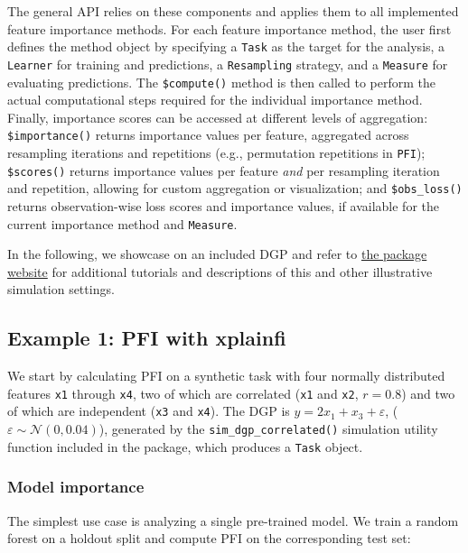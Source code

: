 The general  API relies on these components and applies them to all implemented feature importance methods.
For each feature importance method, the user first defines the method object by specifying a \texttt{Task} as the target for the analysis, a \texttt{Learner} for training and predictions, a \texttt{Resampling} strategy, and a \texttt{Measure} for evaluating predictions.
The \texttt{\$compute()} method is then called to perform the actual computational steps required for the individual importance method.
Finally, importance scores can be accessed at different levels of aggregation:
\texttt{\$importance()} returns importance values per feature, aggregated across resampling iterations and repetitions (e.g., permutation repetitions in \texttt{PFI});
\texttt{\$scores()} returns importance values per feature \emph{and} per resampling iteration and repetition, allowing for custom aggregation or visualization;
and \texttt{\$obs\_loss()} returns observation-wise loss scores and importance values, if available for the current importance method and \texttt{Measure}.

In the following, we showcase  on an included DGP and refer to \href{https://mlr-org.github.io/xplainfi/}{the package website} for additional tutorials and descriptions of this and other illustrative simulation settings.

\subsection{Example 1: PFI with xplainfi}\label{example-1-pfi-with-xplainfi}

We start by calculating PFI on a synthetic task with four normally distributed features \texttt{x1} through \texttt{x4}, two of which are correlated (\texttt{x1} and \texttt{x2}, \(r = 0.8\)) and two of which are independent (\texttt{x3} and \texttt{x4}).
The DGP is \(y = 2 x_1 + x_3 + \varepsilon\), (\(\varepsilon \sim \mathcal{N}(0, 0.04)\)), generated by the \texttt{sim\_dgp\_correlated()} simulation utility function included in the package, which produces a \texttt{Task} object.

\subsubsection{Model importance}\label{model-importance}

The simplest use case is analyzing a single pre-trained model.
We train a  random forest on a holdout split and compute PFI on the corresponding test set:

